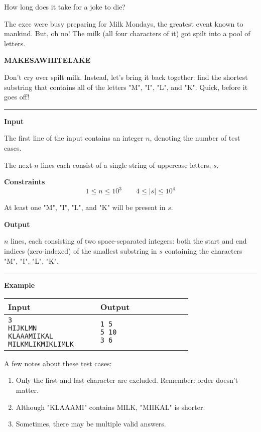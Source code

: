 \togglefalse{IsScore}
{How long does it take for a joke to die?}

The exec were busy preparing for Milk Mondays, the greatest event known to mankind.
But, oh no!
The milk (all four characters of it) got spilt into a pool of letters.

\begin{center}
    \Huge \bfseries \textcolor{uwcsblue}{M}AKESAWH\textcolor{uwcsblue}{I}TE\textcolor{uwcsblue}{L}A\textcolor{uwcsblue}{K}E
\end{center}

Don't cry over spilt milk.
Instead, let's bring it back together: find the shortest substring that contains all of the letters "M", "I", "L", and "K".
Quick, before it goes off!

\vspace{8pt}
\hrule

\textbf{Input}

The first line of the input contains an integer $n$, denoting the number of test cases.

The next $n$ lines each consist of a single string of uppercase letters, $s$.

\textbf{Constraints}
\begin{equation*}
    1 \leq n \leq 10^3 \qquad
    4 \leq |s| \leq 10^4
\end{equation*}

At least one "M", "I", "L", and "K" will be present in $s$.

\textbf{Output}

$n$ lines, each consisting of two space-separated integers: 
both the start and end indices (zero-indexed) of the smallest substring in $s$ containing the characters "M", "I", "L", "K".

\vspace{8pt}
\hrule

\textbf{Example}

\begin{table}[h]
    \centering
    \begin{tabular}{|p{0.4\linewidth}|p{0.4\linewidth}|}
        \hline
        Input & Output \\
        \hline
        \texttt{3\newline
        HIJKLMN\newline
        KLAAAMIIKAL\newline
        MILKMLIKMIKLIMLK\newline}
        & 
        \texttt{1 5\newline 
        5 10\newline
        3 6\newline}
        \\
        \hline
    \end{tabular}
\end{table}

A few notes about these test cases:

\begin{enumerate}
    \item Only the first and last character are excluded. Remember: order doesn't matter.
    \item Although "KLAAAMI" contains MILK, "MIIKAL" is shorter.
    \item Sometimes, there may be multiple valid answers.
\end{enumerate}